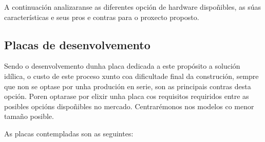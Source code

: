 A continuación analizaranse as diferentes opción de hardware dispoñibles, as súas características e seus pros e contras para o proxecto proposto.

\subsection{Placas de desenvolvemento}


Sendo o desenvolvemento dunha placa dedicada a este propósito a solución idílica, o custo de este proceso xunto coa dificultade final da construción, sempre que non se optase por unha produción en serie, son as principais contras desta opción. Poren optarase por elixir unha placa cos requisitos requiridos entre as posibles opcións dispoñibles no mercado. Centrarémonos nos modelos co menor tamaño posible.

As placas contempladas son as seguintes:

